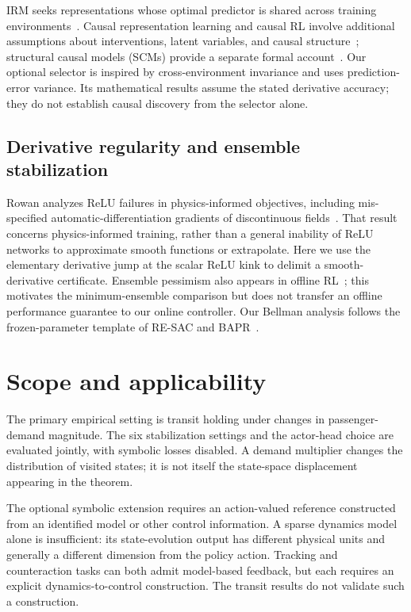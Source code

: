 \documentclass[10pt]{article}
\begin{document}
IRM seeks representations whose optimal predictor is shared across training environments~\cite{Arjovsky2019IRM}. Causal representation learning and causal RL involve additional assumptions about interventions, latent variables, and causal structure~\cite{Scholkopf2021CausalRL,CausalRLSurvey2023}; structural causal models (SCMs) provide a separate formal account~\cite{Peters2017Elements}. Our optional selector is inspired by cross-environment invariance and uses prediction-error variance. Its mathematical results assume the stated derivative accuracy; they do not establish causal discovery from the selector alone.

\subsection{Derivative regularity and ensemble stabilization}
Rowan analyzes ReLU failures in physics-informed objectives, including mis-specified automatic-differentiation gradients of discontinuous fields~\cite{ReLUFailure2023}. That result concerns physics-informed training, rather than a general inability of ReLU networks to approximate smooth functions or extrapolate. Here we use the elementary derivative jump at the scalar ReLU kink to delimit a smooth-derivative certificate. Ensemble pessimism also appears in offline RL~\cite{An2021UncertaintyEnsemble}; this motivates the minimum-ensemble comparison but does not transfer an offline performance guarantee to our online controller. Our Bellman analysis follows the frozen-parameter template of RE-SAC and BAPR~\cite{Zhang2025RESAC,Zhang2025BAPR}.

\section{Scope and applicability}
\label{sec:scope}

The primary empirical setting is transit holding under changes in passenger-demand magnitude. The six stabilization settings and the actor-head choice are evaluated jointly, with symbolic losses disabled. A demand multiplier changes the distribution of visited states; it is not itself the state-space displacement appearing in the theorem.

The optional symbolic extension requires an action-valued reference constructed from an identified model or other control information. A sparse dynamics model alone is insufficient: its state-evolution output has different physical units and generally a different dimension from the policy action. Tracking and counteraction tasks can both admit model-based feedback, but each requires an explicit dynamics-to-control construction. The transit results do not validate such a construction.
\end{document}
